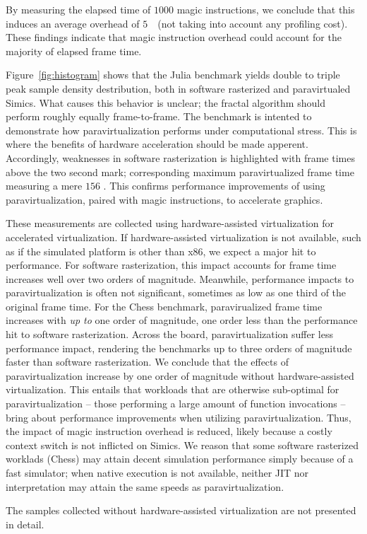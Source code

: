 By measuring the elapsed time of $1000$ magic instructions, we conclude that this induces an average overhead of $5$~\milli\second\ (not taking into account any profiling cost).
These findings indicate that magic instruction overhead could account for the majority of elapsed frame time.

Figure~\ref{fig:histogram} shows that the Julia benchmark yields double to triple peak sample density destribution, both in software rasterized and paravirtualed Simics.
What causes this behavior is unclear; the fractal algorithm should perform roughly equally frame-to-frame.
The benchmark is intented to demonstrate how paravirtualization performs under computational stress.
This is where the benefits of hardware acceleration should be made apperent.
Accordingly, weaknesses in software rasterization is highlighted with frame times above the two second mark; corresponding maximum paravirtualized frame time measuring a mere $156$ \milli\second.
This confirms performance improvements of using paravirtualization, paired with magic instructions, to accelerate graphics.

These measurements are collected using hardware-assisted virtualization for accelerated virtualization.
If hardware-assisted virtualization is not available, such as if the simulated platform is other than x86, we expect a major hit to performance.
For software rasterization, this impact accounts for frame time increases well over two orders of magnitude.
Meanwhile, performance impacts to paravirtualization is often not significant, sometimes as low as one third of the original frame time.
For the Chess benchmark, paravirualized frame time increases with \textit{up to} one order of magnitude, one order less than the performance hit to software rasterization.
Across the board, paravirtualization suffer less performance impact, rendering the benchmarks up to three orders of magnitude faster than software rasterization.
We conclude that the effects of paravirtualization increase by one order of magnitude without hardware-assisted virtualization.
This entails that workloads that are otherwise sub-optimal for paravirtualization -- those performing a large amount of function invocations -- bring about performance improvements when utilizing paravirtualization.
Thus, the impact of magic instruction overhead is reduced, likely because a costly context switch is not inflicted on Simics.
We reason that some software rasterized worklads (Chess) may attain decent simulation performance simply because of a fast simulator; when native execution is not available, neither JIT nor interpretation may attain the same speeds as paravirtualization.

The samples collected without hardware-assisted virtualization are not presented in detail. %
